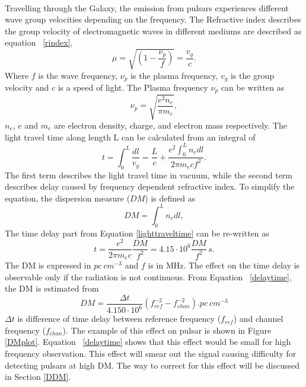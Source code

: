 \documentclass[thesis_msc.tex]{subfiles}
\begin{document}
\paragraph{} Travelling through the Galaxy, the emission from pulsars experiences different wave group velocities depending on the frequency. The Refractive index describes the group velocity of electromagnetic waves in different mediums are described as equation ~\ref{rindex}, 
\begin{equation}\label{rindex}
\mu=\sqrt{(1-\dfrac{\nu_p}{f})}=\dfrac{v_g}{c}.
\end{equation} 
Where $f$ is the wave frequency, $\nu_p$ is the plasma frequency, $v_g$ is the group velocity and $c$ is a speed of light. The Plasma frequency $\nu_p$ can be written as %
 \begin{equation}\label{fp}
 \nu_p=\sqrt{\dfrac{e^2n_e}{\pi m_e}},
  \end{equation} 
$n_e$, $e$ and $m_e$ are electron density, charge, and electron mass respectively. The light travel time along length L can be calculated from an integral of  
\begin{equation}\label{lighttraveltime}
 t=\int_{0}^{L}\dfrac{dl}{v_g}=\dfrac{L}{c}+\dfrac{e^2 \int_{0}^{L} n_e dl}{2\pi m_e c f^2}.
\end{equation} 
The first term describes the light travel time in vacuum, while the second term describes delay caused by frequency dependent refractive index. To simplify the equation, the dispersion measure ($DM$) is defined as  
\begin{equation}
\label{DMdef}
DM=\int_{0}^{L} n_e dl,
\end{equation}
The time delay part from Equation \ref{lighttraveltime} can be re-written as    
\begin{equation}
\label{delaytime}
t=\dfrac{e^2}{2 \pi m_e c }\dfrac{DM}{f^2}=4.15\cdot 10^6 \dfrac{DM}{f^2}\,s.
\end{equation}
The DM is expressed in $pc ~ cm^{-3}$ and $f$ is in MHz. The effect on the time delay is observable only if the radiation is not continuous. From Equation ~\ref{delaytime}, the DM is estimated from 
\begin{equation}
\label{DMcal}
DM=\dfrac{\Delta t}{4.150\cdot 10^6}(f_{ref}^{-2}-f_{chan}^{-2}). pc ~ cm^{-3}
\end{equation}
  $\Delta t$ is difference of time delay between reference frequency ($f_{ref}$) and channel frequency ($f_{chan}$). The example of this effect on pulsar is shown in Figure \ref{DMplot}. Equation ~\ref{delaytime} shows that this effect would be small for high frequency observation. This effect will smear out the signal causing difficulty for detecting pulsars at high DM. The way to correct for this effect will be discussed in Section \ref{DDM}.    
\end{document}
